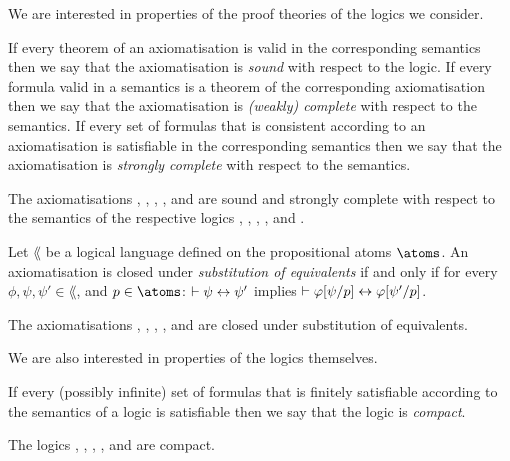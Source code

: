 We are interested in properties of the proof theories of the logics we consider.

\begin{definition}
If every theorem of an axiomatisation is valid in the corresponding semantics then we say that the axiomatisation is {\em sound} with respect to the logic.
If every formula valid in a semantics is a theorem of the corresponding axiomatisation then we say that the axiomatisation is {\em (weakly) complete} with respect to the semantics.
If every set of formulas that is consistent according to an axiomatisation is satisfiable in the corresponding semantics then we say that the axiomatisation is {\em strongly complete} with respect to the semantics.
\end{definition}

\begin{proposition}
The axiomatisations \axiomK{}, \axiomKF{}, \axiomKFF{}, \axiomKD{}, and \axiomS{} are sound and strongly complete with respect to the semantics of the respective logics \logicK{}, \logicKF{}, \logicKFF{}, \logicKD{}, and \logicS{}.
\end{proposition}

\begin{definition}
Let $\lang$ be a logical language defined on the propositional atoms $\atoms$.
An axiomatisation is closed under {\em substitution of equivalents} if and only if for every $\phi, \psi, \psi' \in \lang$, and $\atomP \in \atoms$: $\vdash \psi \leftrightarrow \psi'$ implies $\vdash \varphi[\psi/p] \leftrightarrow \varphi[\psi'/p]$.
\end{definition}

\begin{proposition}
The axiomatisations \axiomK{}, \axiomKF{}, \axiomKFF{}, \axiomKD{}, and \axiomS{} are closed under substitution of equivalents.
\end{proposition}

We are also interested in properties of the logics themselves.

\begin{definition}[Compactness]
If every (possibly infinite) set of formulas that is finitely satisfiable according to the semantics of a logic is satisfiable then we say that the logic is {\em compact}.
\end{definition}

\begin{proposition}
The logics \logicK{}, \logicKF{}, \logicKFF{}, \logicKD{}, and \logicS{} are compact.
\end{proposition}

